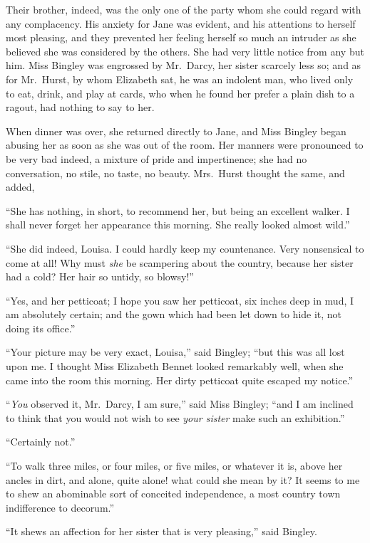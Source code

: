 Their brother, indeed, was the only one of the party
whom she could regard with any complacency. His
anxiety for Jane was evident, and his attentions to herself
most pleasing, and they prevented her feeling herself so
much an intruder as she believed she was considered by
the others. She had very little notice from any but him.
Miss Bingley was engrossed by Mr.\ Darcy, her sister
scarcely less so; and as for Mr.\ Hurst, by whom Elizabeth
sat, he was an indolent man, who lived only to eat, drink,
and play at cards, who when he found her prefer a plain
dish to a ragout, had nothing to say to her.

When dinner was over, she returned directly to Jane,
and Miss Bingley began abusing her as soon as she was
out of the room. Her manners were pronounced to be
very bad indeed, a mixture of pride and impertinence;
she had no conversation, no stile, no taste, no beauty.
Mrs.\ Hurst thought the same, and added,

“She has nothing, in short, to recommend her, but
being an excellent walker. I shall never forget her
appearance this morning. She really looked almost wild.”

“She did indeed, Louisa. I could hardly keep my
countenance. Very nonsensical to come at all! Why
must \textit{she} be scampering about the country, because her
sister had a cold? Her hair so untidy, so blowsy!”

“Yes, and her petticoat; I hope you saw her petticoat,
six inches deep in mud, I am absolutely certain; and the
gown which had been let down to hide it, not doing its
office.”

“Your picture may be very exact, Louisa,” said
Bingley; “but this was all lost upon me. I thought
Miss Elizabeth Bennet looked remarkably well, when she
came into the room this morning. Her dirty petticoat
quite escaped my notice.”

“\textit{You} observed it, Mr.\ Darcy, I am sure,” said Miss
Bingley; “and I am inclined to think that you would
not wish to see \textit{your sister} make such an exhibition.”

“Certainly not.”

“To walk three miles, or four miles, or five miles, or
whatever it is, above her ancles in dirt, and alone, quite
alone! what could she mean by it? It seems to me
to shew an abominable sort of conceited independence,
a most country town indifference to decorum.”

“It shews an affection for her sister that is very
pleasing,” said Bingley.

